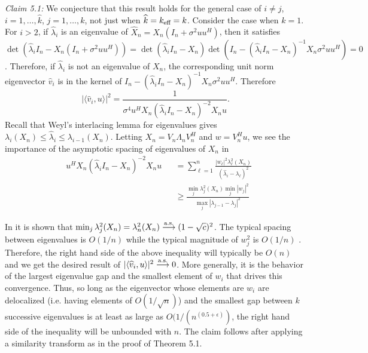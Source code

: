 \textit{Claim 5.1:}  We conjecture that this result holds for the general case of $i\neq
j$, $i=1,\dots,\widehat{k}$, $j=1,\dots,k$, not just when $\widehat{k}=k_\text{eff}=k$. Consider
the case when $k=1$. For $i>2$, if $\widehat{\lambda}_i$ is an eigenvalue of
$\widehat{X}_n=X_n(I_n+\sigma^2uu^H)$, then it satisfies
$\det(\widehat{\lambda}_iI_n-X_n(I_n+\sigma^2uu^H)) =
\det(\widehat{\lambda}_iI_n-X_n)\det(I_n-(\widehat{\lambda}_iI_n-X_n)^{-1}X_n\sigma^2uu^H)=0$. Therefore,
if $\widehat{\lambda}_i$ is not an eigenvalue of $X_n$, the corresponding unit norm
eigenvector $\widehat{v}_i$ is in the kernel of
$I_n-(\widehat{\lambda}_iI_n-X_n)^{-1}X_n\sigma^2uu^H$. Therefore
\begin{equation*}
  |\langle \widehat{v}_i,u\rangle |^2 = \frac{1}{\sigma^4u^HX_n\left(\widehat{\lambda}_iI_n-X_n\right)^{-2}X_nu}.
\end{equation*}
Recall that Weyl's interlacing lemma for eigenvalues gives $\lambda_i(X_n)\leq
\widehat{\lambda}_i\leq \lambda_{i-1}(X_n)$. Letting $X_n=V_n\Lambda_nV_n^H$ and
$w=V_n^Hu$, we see the importance of the
asymptotic spacing of eigenvalues of $X_n$ in
\begin{equation*}
\begin{aligned}
  &u^HX_n(\widehat{\lambda}_iI_n-X_n)^{-2}X_nu
  &&=\sum_{\ell=1}^n\frac{|w_\ell|^2\lambda_\ell^2(X_n)}{\left(\widehat{\lambda}_i-\lambda_\ell\right)^2}\\
  &&&\geq
  \frac{\min_j\lambda_j^2(X_n)\min_j|w_j|^2}{\max_j |\lambda_{j-1}-\lambda_j|^2}
\end{aligned}
\end{equation*}

In \cite{silverstein1985smallest} it is shown that $\min_j\lambda_j^2(X_n)=\lambda_n^2(X_n)
\overset{\textrm{a.s.}}{\longrightarrow} (1-\sqrt{c})^2$. The typical spacing between eigenvalues is $O(1/n)$ while the
typical magnitude of $w_j^2$ is $O(1/n)$ \cite{barvinok2005measure}. Therefore, the right hand side of the above inequality will typically be $O(n)$ and we get the desired
result of $|\langle \widehat{v}_i,u\rangle |^2\overset{\textrm{a.s.}}{\longrightarrow} 0$. More generally, it is the
behavior of the largest eigenvalue gap and the smallest element of $w_i$ that drives this
convergence. Thus, so long as the eigenvector whose elements are $w_i$ are delocalized
(i.e. having elements of $O(1/\sqrt{n})$) and the smallest gap between $k$ successive
eigenvalues is at least as large as $O(1/(n^{(0.5+ \epsilon)})$, the right hand side of the inequality will be unbounded with $n$. The claim follows after applying a similarity transform as in the
proof of Theorem 5.1.



